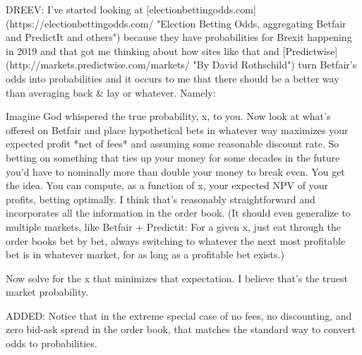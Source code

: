\documentclass{article}
\begin{document}
\begin{markdown}

DREEV:
I've started looking at 
[electionbettingodds.com](https://electionbettingodds.com/ "Election Betting Odds, aggregating Betfair and PredictIt and others")
because they have probabilities for Brexit happening in 2019 and that got me thinking about how sites like 
that and 
[Predictwise](http://markets.predictwise.com/markets/ "By David Rothschild")
turn Betfair's odds into probabilities and it occurs to me that there should be a better way than averaging back & lay or whatever. 
Namely:

Imagine God whispered the true probability, x, to you. 
Now look at what's offered on Betfair and place hypothetical bets in whatever way maximizes your expected profit *net of fees* and assuming some reasonable discount rate. 
So betting on something that ties up your money for some decades in the future you'd have to nominally more than double your money to break even. 
You get the idea. 
You can compute, as a function of x, your expected NPV of your profits, betting optimally. 
I think that's reasonably straightforward and incorporates all the information in the order book. 
(It should even generalize to multiple markets, like Betfair + Predictit: 
For a given x, just eat through the order books bet by bet, always switching to whatever the next most profitable bet is in whatever market, for as long as a profitable bet exists.)

Now solve for the x that minimizes that expectation. 
I believe that's the truest market probability.

ADDED: Notice that in the extreme special case of no fees, no discounting, and zero bid-ask spread in the order book, that matches the standard way to convert odds to probabilities.


\end{markdown}
\end{document}
